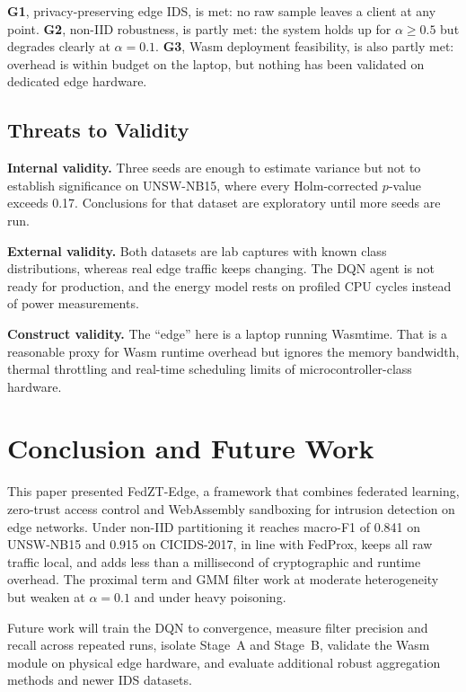 \documentclass[iicol,Numbered]{sn-jnl}
\begin{document}
\textbf{G1}, privacy-preserving edge IDS, is met: no raw sample leaves a client
at any point. \textbf{G2}, non-IID robustness, is partly met: the system holds up
for $\alpha\ge0.5$ but degrades clearly at $\alpha=0.1$. \textbf{G3}, Wasm
deployment feasibility, is also partly met: overhead is within budget on the
laptop, but nothing has been validated on dedicated edge hardware.

\subsection{Threats to Validity}

\textbf{Internal validity.} Three seeds are enough to estimate variance but not
to establish significance on UNSW-NB15, where every Holm-corrected $p$-value
exceeds 0.17. Conclusions for that dataset are exploratory until more seeds are
run.

\textbf{External validity.} Both datasets are lab captures with known class
distributions, whereas real edge traffic keeps changing. The DQN agent is not
ready for production, and the energy model rests on profiled CPU cycles instead
of power measurements.

\textbf{Construct validity.} The ``edge'' here is a laptop running Wasmtime. That
is a reasonable proxy for Wasm runtime overhead but ignores the memory
bandwidth, thermal throttling and real-time scheduling limits of
microcontroller-class hardware.

\section{Conclusion and Future Work}\label{sec:conclusion}

This paper presented FedZT-Edge, a framework that combines federated learning,
zero-trust access control and WebAssembly sandboxing for intrusion detection on
edge networks. Under non-IID partitioning it reaches macro-F1 of 0.841 on
UNSW-NB15 and 0.915 on CICIDS-2017, in line with FedProx, keeps all raw traffic
local, and adds less than a millisecond of cryptographic and runtime overhead.
The proximal term and GMM filter work at moderate heterogeneity but weaken at
$\alpha=0.1$ and under heavy poisoning.

Future work will train the DQN to convergence, measure filter precision and
recall across repeated runs, isolate Stage~A and Stage~B, validate the Wasm
module on physical edge hardware, and evaluate additional robust aggregation
methods and newer IDS datasets.
\end{document}
